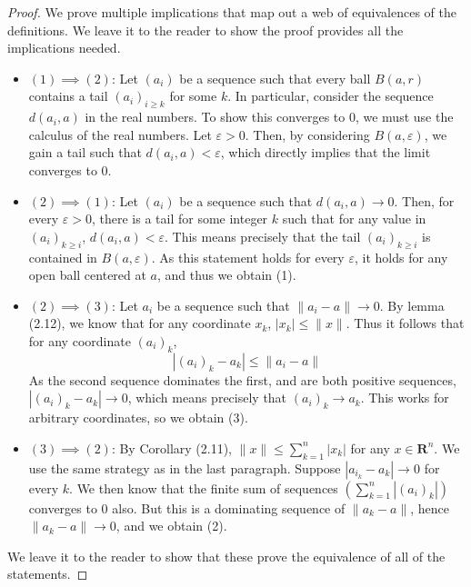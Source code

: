 \begin{proof} We prove multiple implications that map out a web of equivalences of the definitions. We leave it to the reader to show the proof provides all the implications needed.

  \begin{itemize}
  \item $(1) \implies (2)$: Let $(a_i)$ be a sequence such that every ball $B(a,r)$ contains a tail $(a_i)_{i \geq k}$ for some $k$. In particular, consider the sequence $d(a_i, a)$ in the real numbers. To show this converges to 0, we must use the calculus of the real numbers. Let $\varepsilon > 0$. Then, by considering $B(a,\varepsilon)$, we gain a tail such that $d(a_i, a) < \varepsilon$, which directly implies that the limit converges to 0.

  \item $(2) \implies (1)$: Let $(a_i)$ be a sequence such that $d(a_i, a) \to 0$. Then, for every $\varepsilon > 0$, there is a tail for some integer $k$ such that for any value in $(a_i)_{k \geq i}$, $d(a_i, a) < \varepsilon$. This means precisely that the tail $(a_i)_{k \geq i}$ is contained in $B(a,\varepsilon)$. As this statement holds for every $\varepsilon$, it holds for any open ball centered at $a$, and thus we obtain (1).

  \item $(2) \implies (3)$: Let $a_i$ be a sequence such that $\| a_i - a \| \to 0$. By lemma (2.12), we know that for any coordinate $x_k$, $|x_k| \leq \| x \|$. Thus it follows that for any coordinate $(a_i)_k$,
  \[ | (a_i)_k - a_k | \leq \| a_i - a \| \]
  As the second sequence dominates the first, and are both positive sequences, $|(a_i)_k - a_k| \to 0$, which means precisely that $(a_i)_k \to a_k$. This works for arbitrary coordinates, so we obtain (3).

  \item $(3) \implies (2)$: By Corollary (2.11), $\| x \| \leq \sum_{k = 1}^n |x_k|$ for any $x \in \mathbf{R}^n$. We use the same strategy as in the last paragraph. Suppose $|a_{i_k} - a_k| \to 0$ for every $k$. We then know that the finite sum of sequences $(\sum_{k = 1}^n |(a_i)_k|)$ converges to 0 also. But this is a dominating sequence of $\| a_k - a \|$, hence $\| a_k - a \| \to 0$, and we obtain (2).
  \end{itemize}
  We leave it to the reader to show that these prove the equivalence of all of the statements.
\end{proof}

